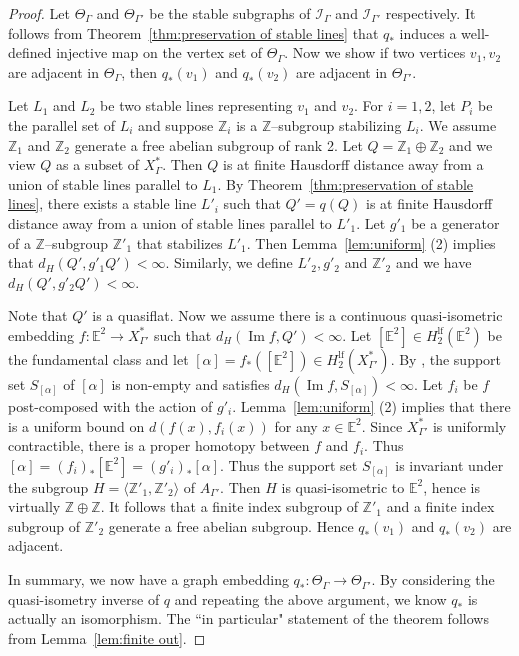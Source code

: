 \documentclass[11pt]{amsart}
\newcommand {\I}{\mathcal I}
\theoremstyle{definition}
\newcommand{\Xa}{X^{\ast}}
\newcommand{\im}{\operatorname{Im}}
\begin{document}
\begin{proof}
	Let $\Theta_\Gamma$ and $\Theta_{\Gamma'}$ be the stable subgraphs of $\I_\Gamma$ and $\I_{\Gamma'}$ respectively. It follows from Theorem~\ref{thm:preservation of stable lines} that $q_\ast$ induces a well-defined injective map on the vertex set of $\Theta_\Gamma$. Now we show if two vertices $v_1,v_2$ are adjacent in $\Theta_\Gamma$, then $q_{\ast}(v_1)$ and $q_{\ast}(v_2)$ are adjacent in $\Theta_{\Gamma'}$.
	
	Let $L_1$ and $L_2$ be two stable lines representing $v_1$ and $v_2$. For $i=1,2$, let $P_i$ be the parallel set of $L_i$ and suppose $\mathbb Z_i$ is a $\mathbb Z$--subgroup stabilizing $L_i$. We assume $\mathbb Z_1$ and $\mathbb Z_2$ generate a free abelian subgroup of rank 2. Let $Q=\mathbb Z_1\oplus\mathbb Z_2$ and we view $Q$ as a subset of $\Xa_\Gamma$. Then $Q$ is at finite Hausdorff distance away from a union of stable lines parallel to $L_1$. By Theorem~\ref{thm:preservation of stable lines}, there exists a stable line $L'_i$ such that $Q'=q(Q)$ is at finite Hausdorff distance away from a union of stable lines parallel to $L'_1$. Let $g'_1$ be a generator of a $\mathbb Z$--subgroup $\mathbb Z'_1$ that stabilizes $L'_1$. Then Lemma~\ref{lem:uniform} (2) implies that $d_H(Q',g'_1 Q')<\infty$. Similarly, we define $L'_2,g'_2$ and $\mathbb Z'_2$ and we have $d_H(Q',g'_2 Q')<\infty$.
	
	Note that $Q'$ is a quasiflat. Now we assume there is a continuous quasi-isometric embedding $f\colon \mathbb E^2\to \Xa_{\Gamma'}$ such that $d_H(\im f, Q')<\infty$. Let $[\mathbb E^2]\in H^{\mathrm{lf}}_{2}(\mathbb E^2)$ be the fundamental class and let $[\alpha]=f_{\ast}([\mathbb E^2])\in H^{\mathrm{lf}}_{2}(\Xa_{\Gamma'})$. By \cite[Lemma 4.3]{bks}, the support set $S_{[\alpha]}$ of $[\alpha]$ is non-empty and satisfies $d_H(\im f, S_{[\alpha]})<\infty$. Let $f_i$ be $f$ post-composed with the action of $g'_i$. Lemma~\ref{lem:uniform} (2) implies that there is a uniform bound on $d(f(x),f_i(x))$ for any $x\in \mathbb E^2$. Since $\Xa_{\Gamma'}$ is uniformly contractible, there is a proper homotopy between $f$ and $f_i$. Thus $[\alpha]=(f_i)_{\ast}[\mathbb E^2]=(g'_i)_{\ast}[\alpha]$. Thus the support set $S_{[\alpha]}$ is invariant under the subgroup $H=\langle\mathbb Z'_1,\mathbb Z'_2\rangle$ of $A_{\Gamma'}$. Then $H$ is quasi-isometric to $\mathbb E^2$, hence is virtually $\mathbb Z\oplus\mathbb Z$. It follows that a finite index subgroup of $\mathbb Z'_1$ and a finite index subgroup of $\mathbb Z'_2$ generate a free abelian subgroup. Hence $q_{\ast}(v_1)$ and $q_{\ast}(v_2)$ are adjacent.
	
	In summary, we now have a graph embedding $q_\ast\colon \Theta_\Gamma\to\Theta_{\Gamma'}$. By considering the quasi-isometry inverse of $q$ and repeating the above argument, we know $q_\ast$ is actually an isomorphism. The ``in particular" statement of the theorem follows from Lemma~\ref{lem:finite out}.
\end{proof}
\end{document}
